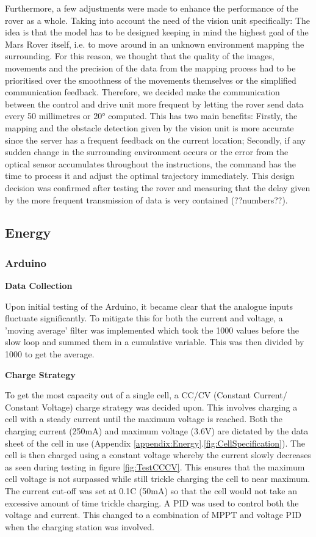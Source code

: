 \documentclass[10pt,twoside]{article}
\begin{document}
Furthermore, a few adjustments were made to enhance the performance of the rover as a whole. Taking into account the need of the vision unit specifically: The idea is that the model has to be designed keeping in mind the highest goal of the Mars Rover itself, i.e. to move around in an unknown environment mapping the surrounding. For this reason, we thought that the quality of the images, movements and the precision of the data from the mapping process had to be prioritised over the smoothness of the movements themselves or the simplified communication feedback. Therefore, we decided make the communication between the control and drive unit more frequent by letting the rover send data every 50 millimetres or 20° computed. This has two main benefits: Firstly, the mapping and the obstacle detection given by the vision unit is more accurate since the server has a frequent feedback on the current location; Secondly, if any sudden change in the surrounding environment occurs or the error from the optical sensor accumulates throughout the instructions, the command has the time to process it and adjust the optimal trajectory immediately. This design decision was confirmed after testing the rover and measuring that the delay given by the more frequent transmission of data is very contained (??numbers??).

\subsection{Energy}
\subsubsection{Arduino}

\textbf{Data Collection}

Upon initial testing of the Arduino, it became clear that the analogue inputs fluctuate significantly. To mitigate this for both the current and voltage, a 'moving average' filter was implemented which took the 1000 values before the slow loop and summed them in a cumulative variable. This was then divided by 1000 to get the average.

\textbf{Charge Strategy}

To get the most capacity out of a single cell, a CC/CV (Constant Current/ Constant Voltage) charge strategy was decided upon. This involves charging a cell with a steady current until the maximum voltage is reached. Both the charging current (250mA) and maximum voltage (3.6V) are dictated by the data sheet of the cell in use (Appendix \ref{appendix:Energy}.\ref{fig:CellSpecification}). The cell is then charged using a constant voltage whereby the current slowly decreases as seen during testing in figure \ref{fig:TestCCCV}. This ensures that the maximum cell voltage is not surpassed while still trickle charging the cell to near maximum. The current cut-off was set at 0.1C (50mA) so that the cell would not take an excessive amount of time trickle charging. A PID was used to control both the voltage and current. This changed to a combination of MPPT and voltage PID when the charging station was involved. 
\end{document}
